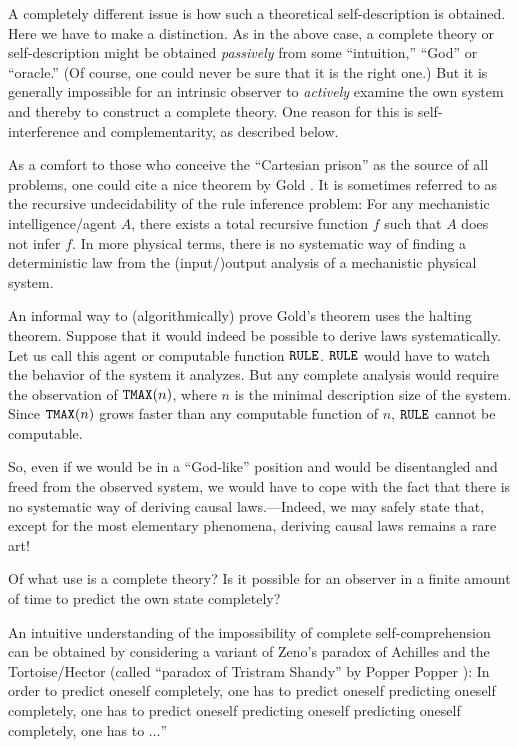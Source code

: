 A completely different issue is how such a theoretical self-description
is obtained. Here we have to make a distinction.
As in the above case, a complete theory or self-description might be
obtained
{\em passively} from some ``intuition,''
``God'' or
``oracle.'' (Of course, one could never be sure that it is the
right one.)
But it is generally impossible for an intrinsic observer to {\em
actively}
 examine the own system and thereby
 to construct a complete theory.
One reason for this is self-interference and complementarity, as
described below.

As a comfort to those who conceive the ``Cartesian prison'' as the
source of all problems, one could cite a nice theorem by Gold
\cite{gold}.
It is sometimes referred to as the recursive undecidability of the
rule inference problem:
For any mechanistic intelligence/agent $A$, there exists a total
recursive function
$f$ such that $A$ does not infer $f$.
In more physical terms,
there is no systematic way of finding a deterministic law from the
(input/)output analysis of a mechanistic physical system.

An informal way to (algorithmically) prove Gold's theorem uses the
halting theorem. Suppose that it would indeed be possible to derive laws
systematically. Let us call this agent or computable function
${\tt RULE}$.
${\tt RULE}$ would have to watch the behavior of the system it analyzes.
But any complete analysis would require the observation of
${\tt TMAX}(n)$,
where $n$ is the minimal description size of the system.
Since ${\tt TMAX}(n)$ grows faster than any computable function of $n$,
${\tt RULE}$ cannot be computable.

So, even if we would be in a ``God-like'' position
and would be
disentangled and freed from the observed system,
we would have to cope with
the fact  that there is no systematic way of deriving
causal laws.---Indeed, we may safely state that, except for the most
elementary phenomena, deriving causal laws remains a rare art!




Of what use is a complete theory?
Is it
possible for an observer
in a finite amount of time to
predict the
own state completely?

An intuitive understanding of the impossibility of complete
self-comprehension  can be
obtained by considering a variant of Zeno's paradox of Achilles and the
Tortoise/Hector (called
``paradox of Tristram Shandy'' by Popper
Popper \cite{popper-48}):
In order
to predict oneself completely, one has
to predict oneself predicting oneself
completely, one has
to predict oneself predicting oneself
predicting oneself
completely, one has to $\ldots$''

